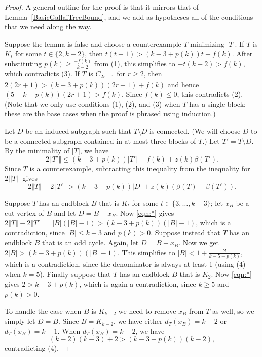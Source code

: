 \documentclass[10pt]{article}
\theoremstyle{plain}
\theoremstyle{definition}
\theoremstyle{remark}
\newcommand{\set}[1]{\left\{ #1 \right\}}
\newcommand{\card}[1]{\left|#1\right|}
\newcommand{\size}[1]{\left\Vert#1\right\Vert}
\newcommand{\parens}[1]{\left( #1 \right)}
\begin{document}
\begin{proof}
A general outline for the proof is that it mirrors that of
Lemma~\ref{BasicGallaiTreeBound}, and we add as hypotheses all of the conditions that
we need along the way.

Suppose the lemma is false and choose a counterexample $T$ minimizing $|T|$. 
If $T$ is $K_t$ for some $t \in \{2,k-2\}$, then $t(t-1) > (k-3 + p(k))t +
f(k)$.  After substituting $p(k)\ge \frac{-f(k)}{k-2}$ from (1), this
simplifies to $-t(k-2)>f(k)$, which contradicts (3).  If $T$ is $C_{2r+1}$ for
$r \ge 2$, then $2(2r+1) > (k-3 + p(k))(2r+1) + f(k)$ and hence
$(5-k-p(k))(2r+1)>f(k)$.  Since $f(k)\le 0$, this contradicts (2).  (Note that
we only use conditions (1), (2), and (3) when $T$ has a single block;
these are the base cases when the proof is phrased using induction.)

Let $D$ be an %
induced subgraph such that $T\setminus D$ is connected.  (We will choose $D$ to
be a connected subgraph contained in at most three blocks of $T$.)
Let $T' = T \setminus D$. %
By the minimality of $|T|$, we have
	\[2\size{T'} \le (k-3 + p(k))\card{T'} + f(k) + z(k)\beta(T').\]
	Since $T$ is a counterexample, subtracting this inequality from the inequality for
$2||T||$ gives
	\begin{equation}
	2\size{T} - 2\size{T'} > (k-3 + p(k))|D| + z(k)(\beta(T) - \beta(T')). \tag{*}\label{eqn:*}
	\end{equation}
	
Suppose $T$ has an endblock $B$ that is $K_t$ for some $t \in \{3,\ldots,
k-3\}$; let $x_B$ be a cut vertex of $B$ and let $D=B-x_B$.
Now \eqref{eqn:*} gives $2\size{T}-2\size{T'} =
\card{B}(\card{B}-1)>(k-3+p(k))(|B|-1)$, which 
is a contradiction, since $|B|\le k-3$ and $p(k)>0$.
Suppose instead that $T$ has an endblock $B$ that is an odd cycle.  Again, let
$D=B-x_B$.  Now we get $2|B|>(k-3+p(k))(|B|-1)$.  This simplifies to $|B|<1+\frac2{k-5+p(k)}$, which is a contradiction, 
since the denominator is always at least 1 (using (4) when $k=5$).
Finally suppose that $T$ has an endblock $B$ that is $K_2$. Now \eqref{eqn:*} gives
$2 > k-3 + p(k)$, which is again a contradiction, since $k \ge 5$ and $p(k) > 0$.
	
To handle the case when $B$ is $K_{k-2}$ we need to remove $x_B$ from $T$ as
well, so we simply let $D=B$.  
Since $B=K_{k-2}$, we have either $d_T(x_B) = k - 2$ or $d_T(x_B) =
k-1$. When $d_T(x_B) = k - 2$, we have
	\[(k-2)(k-3) +2 > (k-3 + p(k))(k-2),\]
	contradicting (4).
	

\end{proof}
\end{document}
